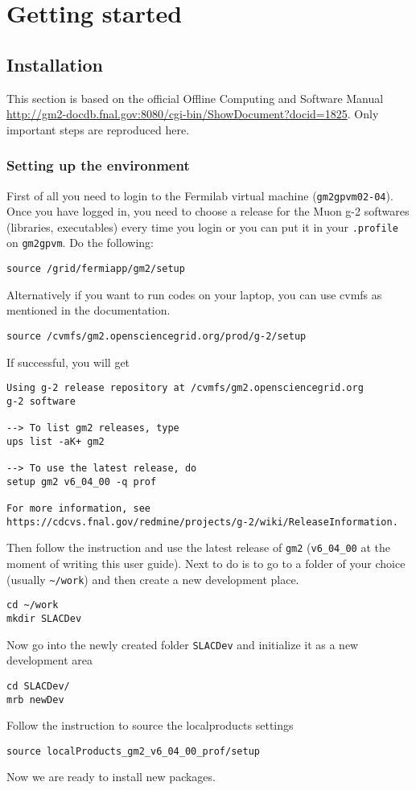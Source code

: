\chapter{Getting started}
\label{chap:getstarted}

\section{Installation}

This section is based on the official Offline Computing and Software Manual \url{http://gm2-docdb.fnal.gov:8080/cgi-bin/ShowDocument?docid=1825}.
Only important steps are reproduced here.

\subsection{Setting up the environment}

First of all you need to login to the Fermilab virtual machine (\verb+gm2gpvm02-04+).
Once you have logged in, you need to choose a release for the Muon g-2 softwares (libraries, executables)
every time you login or you can put it in your \verb+.profile+ on \verb+gm2gpvm+. Do the following:
%
\begin{Verbatim}[frame=single]
source /grid/fermiapp/gm2/setup
\end{Verbatim}
%
Alternatively if you want to run codes on your laptop, you can use cvmfs as mentioned in the documentation.
%
\begin{Verbatim}[frame=single]
source /cvmfs/gm2.opensciencegrid.org/prod/g-2/setup
\end{Verbatim}
%
If successful, you will get
%
\begin{Verbatim}[frame=single]
Using g-2 release repository at /cvmfs/gm2.opensciencegrid.org
g-2 software

--> To list gm2 releases, type
ups list -aK+ gm2

--> To use the latest release, do
setup gm2 v6_04_00 -q prof

For more information, see
https://cdcvs.fnal.gov/redmine/projects/g-2/wiki/ReleaseInformation.
\end{Verbatim}
%
Then follow the instruction and use the latest release of \verb+gm2+ (\verb+v6_04_00+ at the moment of writing this user guide).
Next to do is to go to a folder of your choice (usually \verb+~/work+) and then create a new development place.
%
\begin{Verbatim}[frame=single]
cd ~/work
mkdir SLACDev
\end{Verbatim}
%
Now go into the newly created folder \verb+SLACDev+ and initialize it as a new development area
%
\begin{Verbatim}[frame=single]
cd SLACDev/
mrb newDev
\end{Verbatim}
%
Follow the instruction to source the localproducts settings
%
\begin{Verbatim}[frame=single]
source localProducts_gm2_v6_04_00_prof/setup
\end{Verbatim}
%
Now we are ready to install new packages.

